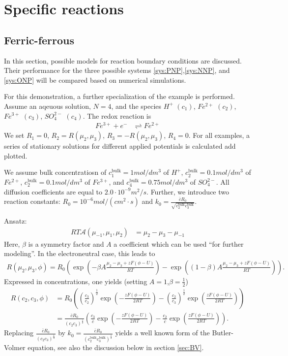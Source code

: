\documentclass[12pt,oneside,reqno]{amsart}
\numberwithin{equation}{section}
\begin{document}
\section{Specific reactions}
\subsection{Ferric-ferrous}
In this section, possible models for reaction boundary
conditions  are  discussed. Their  performance for  the  three  possible
systems \eqref{sys:PNP},\eqref{sys:NNP}, and \eqref{sys:ONP} will be compared based
on numerical simulations.

For this demonstration, a further specialization of the example is performed.
Assume an aqeuous solution, $N=4$, and the species $H^+$ $(c_1)$, $Fe^{2+}$ $(c_2)$,  $Fe^{3+}$ $(c_3)$,
$SO_4^{2-}$ $(c_4)$. The redox reaction is
\begin{align}\label{eq:redox}
     Fe^{3+} + e^- &\rightleftharpoons Fe^{2+}
\end{align}
We set $R_1=0$, $R_2=R(\mu_2,\mu_3)$, $R_3=-R(\mu_2,\mu_3)$, $R_4=0$.
For  all examples, a series of stationary solutions for different
applied potentials is calculated add plotted.

We  assume  bulk  concentratiosn of  $c_1^\text{bulk}=1  mol/dm^3$  of
$H^+$,        $c_2^\text{bulk}=0.1mol/dm^3$       of        $Fe^{2+}$,
$c_2^\text{bulk}=0.1mol/dm^3$         of        $Fe^{3+}$,         and
$c_4^\text{bulk}=0.75mol/dm^3$    of   $SO_4^{2-}$.    All   diffusion
coefficients   are  equal   to  $2.0\cdot10^{-9}m^2/s$.   Further,  we
introduce two reaction constants:  $R_0=10^{-6} mol/(cm^2\cdot s)$ and
$k_0= \frac{\bar c R_0}{\sqrt{c_2^\text{bulk}c_3^\text{bulk}}}$.


Ansatz:
\begin{align}\label{eq:MBV}
  RT\mathcal A(\mu_{-1}, \mu_1,\mu_2)&=\mu_2-\mu_3-\mu_{-1}
\end{align}
Here, $\beta$ is a symmetry factor and $A$ a coefficient which can be used
``for further modeling''.
In the electroneutral case, this leads to 
\begin{align}\label{eq:MBVneu}
  R(\mu_2,\mu_3,\phi)= R_0\left(\exp\left(-\beta A\frac{\mu_2-\mu_3+zF(\phi-U)}{RT}\right)-\exp\left((1-\beta)A\frac{\mu_2-\mu_3+zF(\phi-U)}{RT}\right)\right).
\end{align}
Expressed in concentrations, one yields (setting $A=1$,$\beta=\frac12$)
\begin{align}
  R(c_2,c_3,\phi)&= R_0\left( \left(\frac{c_3}{c_2}\right)^{\frac12}\exp\left(-\frac{zF(\phi-U)}{2RT}\right)-\left(\frac{c_2}{c_3}\right)^{\frac12}\exp\left(\frac{zF(\phi-U)}{2RT}\right)\right)\\
                 &= \frac{\bar cR_0}{(c_2c_3)^{\frac12}}\left(\frac{c_3}{\bar c}\exp\left(-\frac{zF(\phi-U)}{2RT}\right)-\frac{c_2}{\bar c}\exp\left(\frac{zF(\phi-U)}{2RT}\right)\right).
\label{eq:MBVohm}
\end{align}
Replacing $\frac{\bar cR_0}{(c_2c_3)^{\frac12}}$ by $k_0=\frac{\bar cR_0}{(c_2^\text{bulk}c_3^\text{bulk})^{\frac12}}$
yields a well known form of the Butler-Volmer equation, see also the discussion below in section \ref{sec:BV}.
\end{document}
